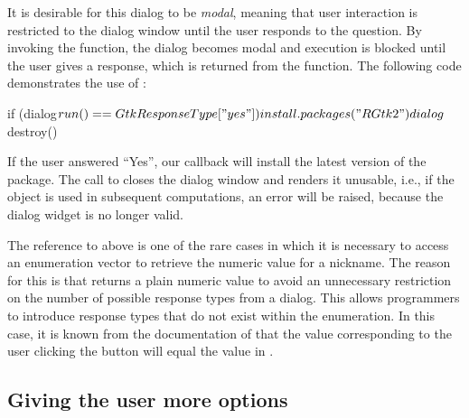 \documentclass[article,shortnames]{jss}
\begin{document}
It is desirable for this dialog to be \emph{modal}, meaning that user
interaction
is restricted to the dialog window until the user responds to the
question. By invoking the  function, the dialog
becomes modal and execution is blocked until the user gives a
response, which is returned from the function. The following code
demonstrates the use of :
\begin{Code}
if (dialog$run() == GtkResponseType["yes"])
 install.packages("RGtk2")
dialog$destroy()
\end{Code}
If the user answered
``Yes'', our callback will install the latest version of the
 package. The call to  closes the
dialog window and renders it unusable, i.e., if the object is used in
subsequent computations, an error will be raised, because the dialog
widget is no longer valid.

The reference to  above is one of the rare cases
in which it is necessary to access an enumeration vector to retrieve
the numeric value for a nickname. The reason for this is that
 returns a plain numeric value to avoid an
unnecessary restriction on the number of possible response types from
a dialog. This allows programmers to introduce response types that do
not exist within the  enumeration.
In this case, it is known from the documentation of
 that the value corresponding to the user
clicking the  button will equal the  value in
.

\subsection{Giving the user more options}
\end{document}
